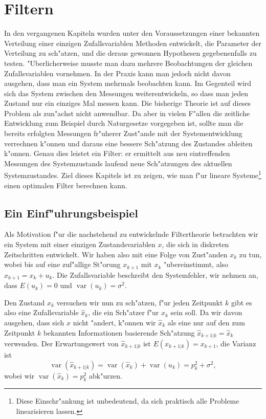 %
%
%
\chapter{Filtern} \label{chapter-filtern}

In den vergangenen Kapiteln wurden unter den Voraussetzungen einer
bekannten Verteilung einer einzigen Zufallsvariablen Methoden entwickelt,
die Parameter der Verteilung zu sch"atzen, und die deraus gewonnen
Hypothesen gegebenenfalls zu testen. "Uberlicherweise musste man dazu
mehrere Beobachtungen der gleichen Zufallsvariablen vornehmen.
In der Praxis kann man jedoch
nicht davon ausgehen, dass man ein System mehrmals beobachten kann.
Im Gegenteil wird sich das System zwischen den Messungen weiterentwickeln,
so dass man jeden Zustand nur ein einziges Mal messen kann. Die bisherige
Theorie ist auf dieses Problem als zun"achst nicht anwendbar.
Da aber in vielen F"allen die zeitliche Entwicklung zum Beispiel durch
Naturgesetze vorgegeben ist, sollte man die bereits erfolgten Messungen
fr"uherer Zust"ande mit der Systementwicklung verrechnen k"onnen und
daraus eine bessere Sch"atzung des Zustandes ableiten k"onnen. Genau
dies leistet ein Filter: er ermittelt aus neu eintreffenden Messungen
des Systemzustands laufend neue Sch"atzungen des aktuellen Systemzustandes.
Ziel dieses Kapitels ist zu zeigen, wie man f"ur lineare Systeme\footnote{Diese
Einschr"ankung ist unbedeutend, da sich praktisch alle Probleme linearisieren lassen.}
einen optimalen Filter berechnen kann.

\section{Ein Einf"uhrungsbeispiel}
Als Motivation f"ur die nachstehend zu entwickelnde Filtertheorie betrachten
wir ein System mit einer einzigen Zustandsvariablen $x$, die sich in diskreten
Zeitschritten entwickelt.
Wir haben also mit eine Folge von Zust"anden $x_k$ zu tun, wobei
bis auf eine zuf"allige St"orung $x_{k+1}$ mit $x_k$ "ubereinstimmt,
also $x_{k+1}=x_k+u_k$. Die Zufallsvariable beschreibt den Systemfehler, wir
nehmen an, dass $E(u_k)=0$ und $\operatorname{var}(u_k)=\sigma^2$.

Den Zustand $x_k$ versuchen wir nun zu sch"atzen, f"ur jeden Zeitpunkt
$k$ gibt es also eine Zufallsvariable $\hat x_k$, die ein Sch"atzer f"ur
$x_k$ sein soll.
Da wir davon ausgehen, dass sich $x$ nicht "andert, k"onnen wir $\hat x_k$
als eine nur auf den zum Zeitpunkt $k$ bekannten Informationen basierende
Sch"atzung $\hat x_{k+1|k}=\hat x_k$ verwenden.
Der Erwartungswert von $\hat x_{k+1|k}$ ist $E(x_{k+1|k})=x_{k+1}$, die Varianz
ist
\[
\operatorname{var}(\hat x_{k+1|k})
=\operatorname{var}(\hat x_k)+\operatorname{var}(u_k)=p_k^2+\sigma^2,
\]
wobei wir $\operatorname{var}(\hat x_k)=p_k^2$ abk"urzen.

